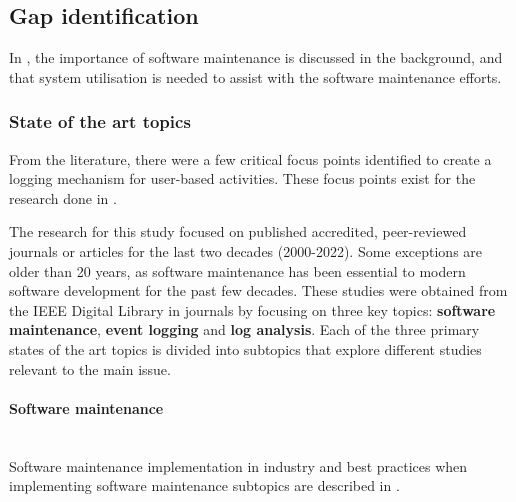 \clearpage

\subsection{Gap identification}
In , the importance of software maintenance is discussed in the background, and that system utilisation is needed to assist with the software maintenance efforts.

\subsubsection{State of the art topics}
From the literature, there were a few critical focus points identified to create a logging mechanism for user-based activities. These focus points exist for the research done in .\par The research for this study focused on published accredited, peer-reviewed journals or articles for the last two decades (2000-2022). Some exceptions are older than 20 years, as software maintenance has been essential to modern software development for the past few decades. These studies were obtained from the IEEE Digital Library in journals by focusing on three key topics: \textbf{software maintenance}, \textbf{event logging} and \textbf{log analysis}. Each of the three primary states of the art topics is divided into subtopics that explore different studies relevant to the main issue.

\paragraph{Software maintenance} \leavevmode\\
Software maintenance implementation in industry and best practices when implementing software maintenance subtopics are described in .

